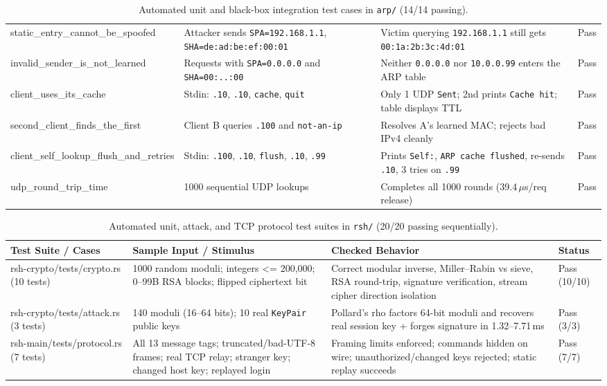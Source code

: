 \documentclass[11pt,a4paper]{article}
\begin{document}
\begin{table}[H]
\begin{tabularx}{\textwidth}{@{}>{\ttfamily\scriptsize}l X X l@{}}
static\_entry\_cannot\_be\_spoofed & Attacker sends \texttt{SPA=192.168.1.1}, \texttt{SHA=de:ad:be:ef:00:01} & Victim querying \texttt{192.168.1.1} still gets \texttt{00:1a:2b:3c:4d:01} & Pass \\
invalid\_sender\_is\_not\_learned & Requests with \texttt{SPA=0.0.0.0} and \texttt{SHA=00:..:00} & Neither \texttt{0.0.0.0} nor \texttt{10.0.0.99} enters the ARP table & Pass \\
client\_uses\_its\_cache & Stdin: \texttt{.10}, \texttt{.10}, \texttt{cache}, \texttt{quit} & Only 1 UDP \texttt{Sent}; 2nd prints \texttt{Cache hit}; table displays TTL & Pass \\
second\_client\_finds\_the\_first & Client B queries \texttt{.100} and \texttt{not-an-ip} & Resolves A's learned MAC; rejects bad IPv4 cleanly & Pass \\
client\_self\_lookup\_flush\_and\_retries & Stdin: \texttt{.100}, \texttt{.10}, \texttt{flush}, \texttt{.10}, \texttt{.99} & Prints \texttt{Self:}, \texttt{ARP cache flushed}, re-sends \texttt{.10}, 3 tries on \texttt{.99} & Pass \\
udp\_round\_trip\_time & 1000 sequential UDP lookups & Completes all 1000 rounds (39.4\,$\mu$s/req release) & Pass \\
\bottomrule
\end{tabularx}
\caption{Automated unit and black-box integration test cases in \texttt{arp/} (14/14 passing).}
\label{tab:arptests}
\end{table}

\begin{table}[H]
\centering
\footnotesize
\begin{tabularx}{\textwidth}{@{}>{\ttfamily\scriptsize}l X X l@{}}
\toprule
\normalfont\textbf{Test Suite / Cases} & \textbf{Sample Input / Stimulus} & \textbf{Checked Behavior} & \textbf{Status} \\
\midrule
rsh-crypto/tests/crypto.rs (10 tests) & 1000 random moduli; integers <= 200,000; 0--99B RSA blocks; flipped ciphertext bit & Correct modular inverse, Miller--Rabin vs sieve, RSA round-trip, signature verification, stream cipher direction isolation & Pass (10/10) \\
rsh-crypto/tests/attack.rs (3 tests) & 140 moduli (16--64 bits); 10 real \texttt{KeyPair} public keys & Pollard's rho factors 64-bit moduli and recovers real session key + forges signature in 1.32--7.71\,ms & Pass (3/3) \\
rsh-main/tests/protocol.rs (7 tests) & All 13 message tags; truncated/bad-UTF-8 frames; real TCP relay; stranger key; changed host key; replayed login & Framing limits enforced; commands hidden on wire; unauthorized/changed keys rejected; static replay succeeds & Pass (7/7) \\
\bottomrule
\end{tabularx}
\caption{Automated unit, attack, and TCP protocol test suites in \texttt{rsh/} (20/20 passing sequentially).}
\label{tab:rshtests}
\end{table}
\end{document}
